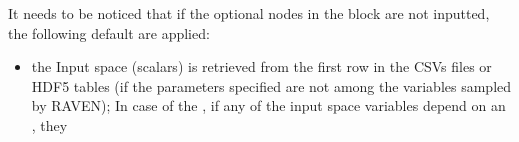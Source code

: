 \begin{itemize}
  It needs to be noticed that if the optional nodes in the block  are not inputted, the following default are applied:
    \begin{itemize}
       \item the Input space (scalars) is retrieved from the first row in the CSVs files or HDF5 tables (if the parameters specified are not 
          among the variables sampled by RAVEN); In case of the  , if any of the input space variables depend on an , they 

\end{itemize}
\end{itemize}
